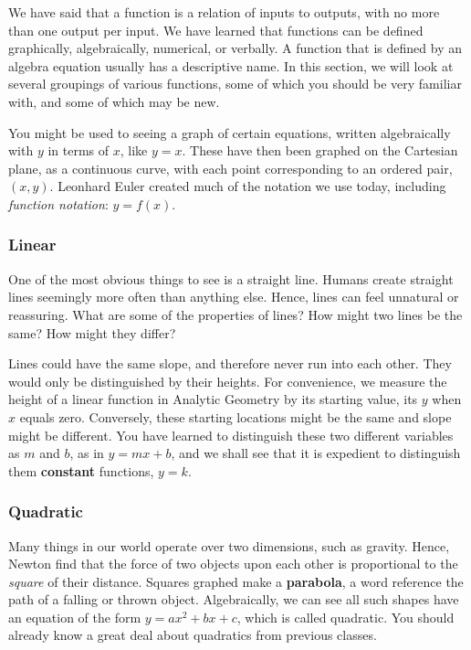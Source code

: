 



We have said that a function is a relation of inputs to outputs, with no more than one output per input.  
We have learned that functions can be defined graphically, algebraically, numerical, or verbally.
A function that is defined by an algebra equation usually has a descriptive name.
In this section, we will look at several groupings of various functions, some of which you should
be very familiar with, and some of which may be new.


You might be used to seeing a  \gls{graph} of certain equations, written algebraically with $y$ in terms
of $x$, like $y=x$.  These have then been graphed on the Cartesian plane, as a continuous curve,
with each point corresponding to an ordered pair, $(x,y)$.  Leonhard Euler created much of the notation
we use today, including \emph{function notation}: $y=f(x)$.

\subsubsection{Linear}
One of the most obvious things to see is a straight line.  
Humans create straight lines seemingly more often
than anything else.  Hence, lines can feel unnatural or reassuring.  
What are some of the properties of lines?
How might two lines be the same?  How might they differ?  

Lines could have the same slope, and therefore never run into each other.  
They would only be distinguished by their
heights.  For convenience, we measure the height of a \gls{linear} function 
in Analytic Geometry by its starting value, its $y$ when $x$ 
equals zero.  Conversely, these starting locations might be the same and 
slope might be different.  You have learned 
to distinguish these two different variables as $m$ and $b$, as in $y=mx+b$, and we shall see
that it is expedient to distinguish them \textbf{constant} functions, $y=k$.

\subsubsection{Quadratic}
Many things in our world operate over two dimensions, such as gravity.  
Hence, Newton find that the force
of two objects upon each other is proportional to the \emph{square} of their distance.  
Squares graphed make a
\textbf{parabola}, a word reference the path of a falling or thrown object.  
Algebraically, we can see all such shapes
have an equation of the form $y=ax^2+bx+c$, which is called \gls{quadratic}.  
You should already know a great deal about quadratics from previous classes.

